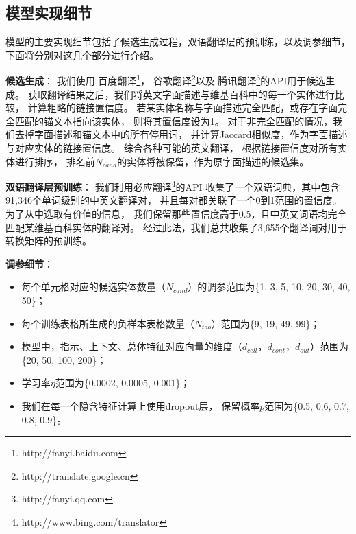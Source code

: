 
\subsection{模型实现细节}
\label{sec:tabel-impl}

模型的主要实现细节包括了候选生成过程，双语翻译层的预训练，以及调参细节，
下面将分别对这几个部分进行介绍。

\textbf{候选生成}：
我们使用
百度翻译\footnote{http://fanyi.baidu.com}，
谷歌翻译\footnote{http://translate.google.cn}以及
腾讯翻译\footnote{http://fanyi.qq.com}的API用于候选生成。
获取翻译结果之后，我们将英文字面描述与维基百科中的每一个实体进行比较，
计算粗略的链接置信度。
若某实体名称与字面描述完全匹配，或存在字面完全匹配的锚文本指向该实体，
则将其置信度设为1。
对于非完全匹配的情况，我们去掉字面描述和锚文本中的所有停用词，
并计算Jaccard相似度，作为字面描述与对应实体的链接置信度。
综合各种可能的英文翻译，
根据链接置信度对所有实体进行排序，
排名前$N_{cand}$的实体将被保留，作为原字面描述的候选集。

\textbf{双语翻译层预训练}：
我们利用必应翻译\footnote{http://www.bing.com/translator}的API
收集了一个双语词典，其中包含91,346个单词级别的中英文翻译对，
并且每对都关联了一个0到1范围的置信度。
为了从中选取有价值的信息，
我们保留那些置信度高于0.5，且中英文词语均完全匹配某维基百科实体的翻译对。
经过此法，我们总共收集了3,655个翻译词对用于转换矩阵的预训练。

\textbf{调参细节}：
\begin{itemize}
\item 每个单元格对应的候选实体数量（$N_{cand}$）的调参范围为\{1, 3, 5, 10, 20, 30, 40, 50\}；
\item 每个训练表格所生成的负样本表格数量（$N_{tab}$）范围为\{9, 19, 49, 99\}；
\item 模型中，指示、上下文、总体特征对应向量的维度（$d_{cell}$，$d_{cont}$，$d_{out}$）范围为\{20, 50, 100, 200\}；
\item 学习率$\eta$范围为\{0.0002, 0.0005, 0.001\}；
\item 我们在每一个隐含特征计算上使用dropout层\cite{srivastava2014dropout}，
保留概率$p$范围为\{0.5, 0.6, 0.7, 0.8, 0.9\}。
\end{itemize}




